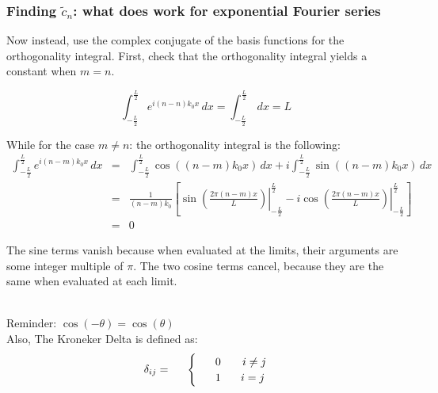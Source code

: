 \documentclass[12pt]{article}
\begin{document}
\begin{flushleft}
\subsubsection*{\bf Finding $\tilde{c}_{n}$: what does work for exponential Fourier series}

Now instead, use the complex conjugate of the basis functions for the orthogonality integral.  First, check that the orthogonality integral yields a constant when $m=n$.

\[
\int_{-\frac{L}{2}}^{\frac{L}{2}} e^{i(n-n)k_{0}x} \, dx = \int_{-\frac{L}{2}}^{\frac{L}{2}} \, dx = L
\]

While for the case $m \ne n$: the orthogonality integral is the following:
\begin{eqnarray*}
\int_{-\frac{L}{2}}^{\frac{L}{2}} e^{i(n-m)k_{0}x} \, dx & = & \int_{-\frac{L}{2}}^{\frac{L}{2}} \cos{((n-m)k_{0}x)}\, dx + i\int_{-\frac{L}{2}}^{\frac{L}{2}} \sin{((n-m)k_{0}x)}\, dx \\
& = & \frac{1}{(n-m)k_{0}} \left[ \left. \sin{\left( \frac{2\pi (n-m)x}{L}\right)}  \right\vert _{-\frac{L}{2}}^{\frac{L}{2}}
-i \left. \cos{\left( \frac{2\pi (n-m)x}{L}\right)} \right\vert _{-\frac{L}{2}}^{\frac{L}{2}} \right] \\
& = & 0 
\end{eqnarray*}

The sine terms vanish because when evaluated at the limits, their arguments are some integer multiple of $\pi$.  The two cosine terms cancel, because they are the same when evaluated at each limit.

\vspace{-.2in}
{\color{grey} \hrulefill}\\
Reminder:  $\cos{(-\theta)}=\cos{(\theta)}$\\
Also, The Kroneker Delta is defined as: 
\begin{equation*}
\delta_{ij} = \hspace{.2in}
\begin{cases}
 & \hspace{.1in} 0 \hspace{.27in}  i \neq j \\
 & \hspace{.1in} 1  \hspace{.25in}  i=j
\end{cases}
\end{equation*}
\vspace{-.1in}
{\color{grey} \hrulefill}\\


\end{flushleft}
\end{document}
